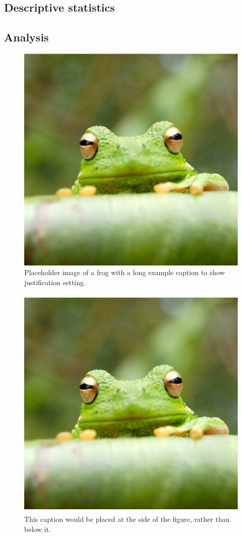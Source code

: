 \documentclass[9pt,twocolumn,twoside,lineno]{pnas-new}
\begin{document}
\subsection*{Descriptive statistics}



\subsection*{Analysis}



\begin{figure}%
\centering
\includegraphics[width=.8\linewidth]{frog}
\caption{Placeholder image of a frog with a long example caption to show justification setting.}
\label{fig:frog}
\end{figure}


\begin{figure}
\centering
\includegraphics[width=11.4cm,height=11.4cm]{frog}
\caption{This caption would be placed at the side of the figure, rather than below it.}\label{fig:side}
\end{figure}
\end{document}
